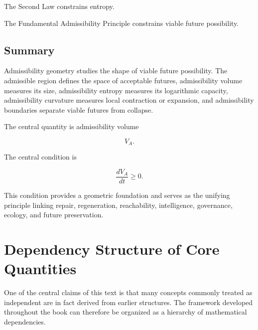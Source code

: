 \documentclass[12pt,twoside,openright]{book}
\begin{document}
The Second Law constrains entropy.

The Fundamental Admissibility Principle constrains viable
future possibility.

\subsection{Summary}

Admissibility geometry studies the shape of viable future
possibility. The admissible region defines the space of
acceptable futures, admissibility volume measures its
size, admissibility entropy measures its logarithmic
capacity, admissibility curvature measures local
contraction or expansion, and admissibility boundaries
separate viable futures from collapse.

The central quantity is admissibility volume

\[
V_A.
\]

The central condition is

\[
\frac{dV_A}{dt}\ge0.
\]

This condition provides a geometric foundation 
and serves as the unifying principle linking
repair, regeneration, reachability, intelligence,
governance, ecology, and future preservation.

\section{Dependency Structure of Core Quantities}

One of the central claims of this text is that many
concepts commonly treated as independent are in fact
derived from earlier structures. The framework developed
throughout the book can therefore be organized as a
hierarchy of mathematical dependencies.
\end{document}

